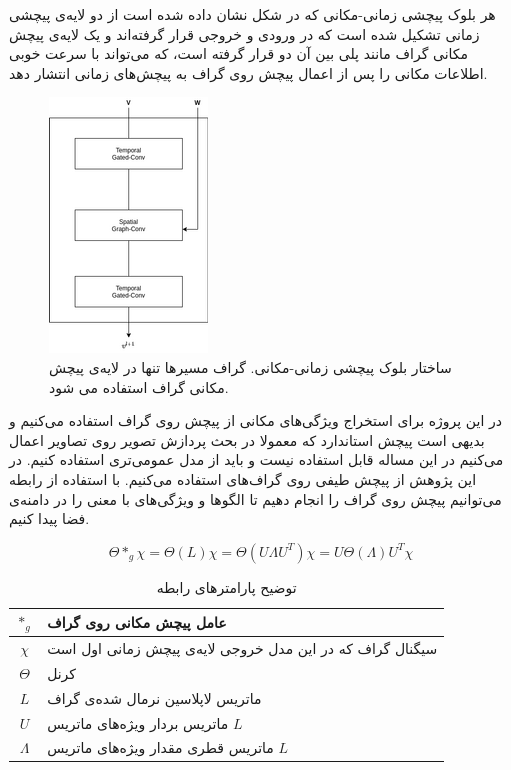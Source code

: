 \documentclass{article}
\begin{document}
هر بلوک پیچشی زمانی-مکانی که در شکل  نشان داده شده است از دو لایه‌ی پیچشی زمانی تشکیل شده است که در ورودی و خروجی قرار گرفته‌اند
و یک لایه‌ی پیچش مکانی گراف مانند پلی بین آن دو قرار گرفته است، که می‌تواند با سرعت خوبی اطلاعات مکانی را پس از اعمال پیچش روی گراف
به پیچش‌های زمانی انتشار دهد.

\begin{figure}
  \includegraphics{./images/inner-blocks.png}
  \centering
  \caption{
ساختار بلوک پیچشی زمانی-مکانی. گراف مسیرها تنها در لایه‌ی پیچش مکانی گراف استفاده می شود. 
  }
  \label{fig:inner-blocks}
\end{figure}

در این پروژه برای استخراج ویژگی‌های مکانی از پیچش روی گراف استفاده می‌کنیم و بدیهی است پیچش استاندارد که معمولا
در بحث پردازش تصویر روی تصاویر اعمال می‌کنیم در این مساله قابل استفاده نیست و باید از مدل عمومی‌تری استفاده کنیم.
در این پژوهش از پیچش طیفی روی گراف‌های استفاده می‌کنیم. 
با استفاده از رابطه  می‌توانیم پیچش روی گراف را انجام دهیم تا الگوها و ویژگی‌های با معنی را در دامنه‌ی فضا پیدا کنیم.

\begin{equation}
  \Theta *_{g} \chi = \Theta(L)\chi = \Theta(U \Lambda U^{T})\chi = U\Theta(\Lambda)U^{T}\chi
  \label{eq:convolution}
\end{equation}

\begin{table}[h]
  \centering
  \caption{توضیح پارامترهای رابطه }
  \begin{tabular}{|c|p{}|}
    \hline
    $*_{g}$ & عامل پیچش مکانی روی گراف \\
    \hline
    $\chi$ & سیگنال گراف که در این مدل خروجی لایه‌ی پیچش زمانی اول است \\
    \hline
    $\Theta$ & کرنل \\
    \hline
    $L$ & ماتریس لاپلاسین نرمال شده‌ی گراف \\
    \hline
    $U$ & ماتریس بردار ویژه‌های ماتریس $L$ \\
    \hline
    $\Lambda$ & ماتریس قطری مقدار ویژه‌های ماتریس $L$ \\
    \hline
  \end{tabular}
  \label{tbl:distance}
\end{table}
\end{document}
